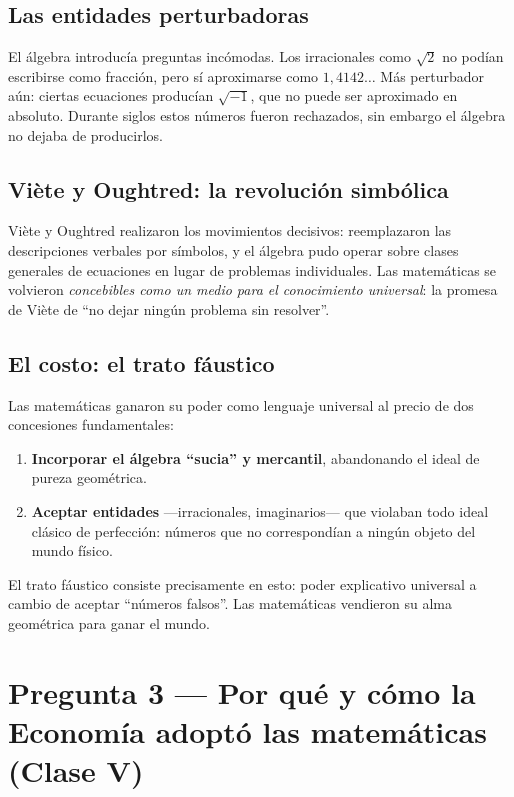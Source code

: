 \documentclass[a4paper,12pt]{article}
\begin{document}
\subsection*{Las entidades perturbadoras}

El álgebra introducía preguntas incómodas. Los irracionales como $\sqrt{2}$ no podían escribirse como fracción, pero sí aproximarse como $1{,}4142\ldots$ Más perturbador aún: ciertas ecuaciones producían $\sqrt{-1}$, que no puede ser aproximado en absoluto. Durante siglos estos números fueron rechazados, sin embargo el álgebra no dejaba de producirlos.

\subsection*{Viète y Oughtred: la revolución simbólica}

Viète y Oughtred realizaron los movimientos decisivos: reemplazaron las descripciones verbales por símbolos, y el álgebra pudo operar sobre clases generales de ecuaciones en lugar de problemas individuales. Las matemáticas se volvieron \textit{concebibles como un medio para el conocimiento universal}: la promesa de Viète de ``no dejar ningún problema sin resolver''.

\subsection*{El costo: el trato fáustico}

Las matemáticas ganaron su poder como lenguaje universal al precio de dos concesiones fundamentales:

\begin{enumerate}
  \item \textbf{Incorporar el álgebra ``sucia'' y mercantil}, abandonando el ideal de pureza geométrica.
  \item \textbf{Aceptar entidades} ---irracionales, imaginarios--- que violaban todo ideal clásico de perfección: números que no correspondían a ningún objeto del mundo físico.
\end{enumerate}

El trato fáustico consiste precisamente en esto: poder explicativo universal a cambio de aceptar ``números falsos''. Las matemáticas vendieron su alma geométrica para ganar el mundo.

\vspace{1.5em}

\section{Pregunta 3 — Por qué y cómo la Economía adoptó las matemáticas (Clase V)}
\end{document}
